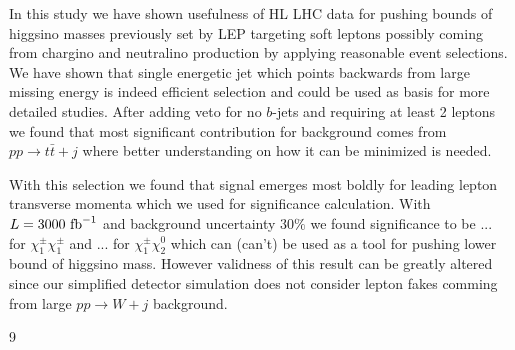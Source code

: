 \documentclass[tightenline,notitlepage,nofootinbib]{revtex4-1}
\begin{document}

In this study we have shown usefulness of HL LHC data for pushing bounds of higgsino masses previously set by LEP targeting soft leptons possibly coming from chargino and neutralino production by applying reasonable event selections. We have shown that single energetic jet which points backwards from large missing energy is indeed efficient selection and could be used as basis for more detailed studies. After adding veto for no $b$-jets and requiring at least 2 leptons we found that most significant contribution for background comes from $pp \to t \bar{t} + j$ where better understanding on how it can be minimized is needed.

With this selection we found that signal emerges most boldly for leading lepton transverse momenta which we used for significance calculation. With $L=3000~\rm{fb}^{-1}$ and background uncertainty $30 \%$ we found significance to be $...$ for $\chi_1^{\pm} \chi_1^{\pm}$ and $...$ for $\chi_1^{\pm} \chi_2^0$ which can (can't) be used as a tool for pushing lower bound of higgsino mass. However validness of this result can be greatly altered since our simplified detector simulation does not consider lepton fakes comming from large $pp \to W +j$ background. 


%
{9}
%
  
\end{document}
